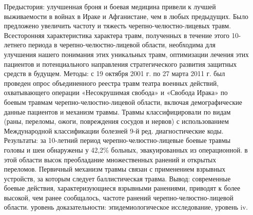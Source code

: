 Предыстория: улучшенная броня и боевая медицина привели к лучшей выживаемости в
войнах в Ираке и Афганистане, чем в любых предыдущих. Было предложено увеличить
частоту и тяжесть черепно-челюстно-лицевых травм. Всесторонняя характеристика
характера травм, полученных в течение этого 10-летнего периода в
черепно-челюстно-лицевой области, необходима для улучшения нашего понимания этих
уникальных травм, оптимизации лечения этих пациентов и потенциального
направления стратегического развития защитных средств в будущем. Методы: с 19
октября 2001 г. по 27 марта 2011 г. был проведен опрос объединенного реестра
травм театра военных действий, охватывающего операции «Несокрушимая свобода» и
«Свобода Ирака» по боевым травмам черепно-челюстно-лицевой области, включая
демографические данные пациентов и механизм травмы. Травмы классифицировали по
видам (раны, переломы, ожоги, повреждения сосудов и нервов) с использованием
Международной классификации болезней 9-й ред. диагностические коды. Результаты:
за 10-летний период черепно-челюстно-лицевые боевые травмы головы и шеи
обнаружены у 42,2\% больных, эвакуированных из операционной. в этой области высок
преобладание множественных ранений и открытых переломов. Первичный механизм
травмы связан с применением взрывных устройств, за которым следует
баллистическая травма. Вывод: современные боевые действия, характеризующиеся
взрывными ранениями, приводят к более высокой, чем ранее сообщалось, частоте
ранений черепно-челюстно-лицевой области. уровень доказательности:
эпидемиологическое исследование, уровень iv.\cite{chan2012}

